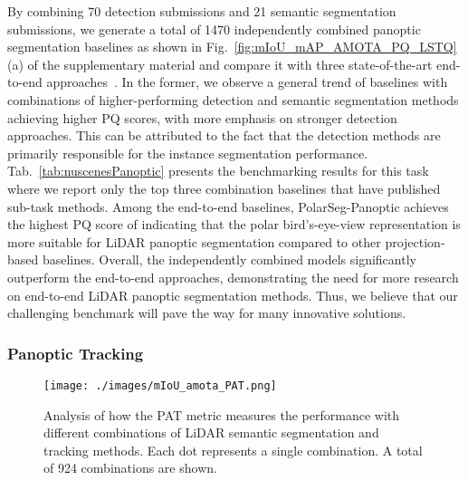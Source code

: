 \documentclass[letterpaper, 10 pt, journal, twoside]{IEEEtran}
\newcommand{\figref}[1]{Fig.~\ref{#1}}
\newcommand{\tabref}[1]{Tab.~\ref{#1}}
\begin{document}
By combining 70 detection submissions and 21 semantic segmentation submissions, we generate a total of 1470 independently combined panoptic segmentation baselines as shown in \figref{fig:mIoU_mAP_AMOTA_PQ_LSTQ}(a) of the supplementary material and compare it with three state-of-the-art end-to-end approaches~\cite{hurtado2020mopt, sirohi2021efficientlps, zhou2021panoptic}. In the former, we observe a general trend of baselines with combinations of higher-performing detection and semantic segmentation methods achieving higher PQ scores, with more emphasis on stronger detection approaches. This can be attributed to the fact that the detection methods are primarily responsible for the instance segmentation performance. \tabref{tab:nuscenesPanoptic} presents the benchmarking results for this task where we report only the top three combination baselines that have published sub-task methods. Among the end-to-end baselines, PolarSeg-Panoptic achieves the highest PQ score of  indicating that the polar bird's-eye-view representation is more suitable for LiDAR panoptic segmentation compared to other projection-based baselines. 
Overall, the independently combined models significantly outperform the end-to-end approaches, demonstrating the need for more research on end-to-end LiDAR panoptic segmentation methods. Thus, we believe that our challenging benchmark will pave the way for many innovative solutions.  

\subsubsection{Panoptic Tracking}

\begin{figure}
\centering
\texttt{[image: ./images/mIoU\_amota\_PAT.png]}
\caption{Analysis of how the PAT metric measures the performance with different combinations of LiDAR semantic segmentation and tracking methods. Each dot represents a single combination. A total of 924 combinations are shown.}
\label{fig:mIoU_amota_PAT}
\vspace{-0.2cm}
\end{figure}
\end{document}
